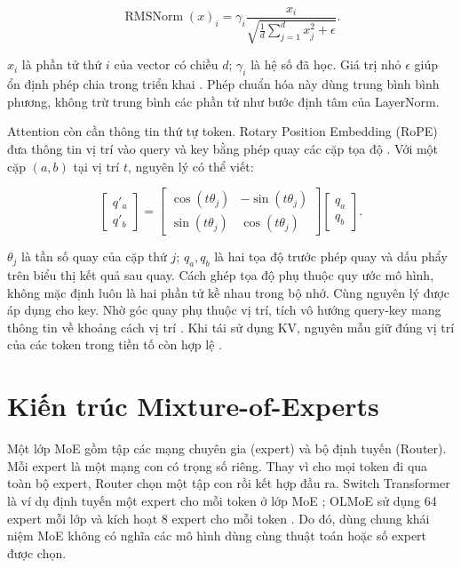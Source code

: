 \begin{equation}
\label{eq:2.3}
\operatorname{RMSNorm}(x)_i=\gamma_i\frac{x_i}{\sqrt{\frac{1}{d}\sum_{j=1}^{d}x_j^2+\epsilon}}.
\end{equation}

$x_i$ là phần tử thứ $i$ của vector có chiều $d$; $\gamma_i$ là hệ số đã học. Giá trị nhỏ $\epsilon$ giúp ổn định phép chia trong triển khai \cite{moe_tierengine_arch}. Phép chuẩn hóa này dùng trung bình bình phương, không trừ trung bình các phần tử như bước định tâm của LayerNorm.

Attention còn cần thông tin thứ tự token. Rotary Position Embedding (RoPE) đưa thông tin vị trí vào query và key bằng phép quay các cặp tọa độ \cite[mục 3.2]{roformer}. Với một cặp $(a,b)$ tại vị trí $t$, nguyên lý có thể viết:

\begin{equation}
\label{eq:2.4}
\begin{bmatrix}q'_a\\q'_b\end{bmatrix}
=\begin{bmatrix}\cos(t\theta_j)&-\sin(t\theta_j)\\\sin(t\theta_j)&\cos(t\theta_j)\end{bmatrix}
\begin{bmatrix}q_a\\q_b\end{bmatrix}.
\end{equation}

$\theta_j$ là tần số quay của cặp thứ $j$; $q_a,q_b$ là hai tọa độ trước phép quay và dấu phẩy trên biểu thị kết quả sau quay. Cách ghép tọa độ phụ thuộc quy ước mô hình, không mặc định luôn là hai phần tử kề nhau trong bộ nhớ. Cùng nguyên lý được áp dụng cho key. Nhờ góc quay phụ thuộc vị trí, tích vô hướng query-key mang thông tin về khoảng cách vị trí \cite{roformer}. Khi tái sử dụng KV, nguyên mẫu giữ đúng vị trí của các token trong tiền tố còn hợp lệ \cite{moe_tierengine_arch}.

\section{Kiến trúc Mixture-of-Experts}

Một lớp MoE gồm tập các mạng chuyên gia (expert) và bộ định tuyến (Router). Mỗi expert là một mạng con có trọng số riêng. Thay vì cho mọi token đi qua toàn bộ expert, Router chọn một tập con rồi kết hợp đầu ra. Switch Transformer là ví dụ định tuyến một expert cho mỗi token ở lớp MoE \cite{switch_transformers}; OLMoE sử dụng 64 expert mỗi lớp và kích hoạt 8 expert cho mỗi token \cite[mục 1]{olmoe}. Do đó, dùng chung khái niệm MoE không có nghĩa các mô hình dùng cùng thuật toán hoặc số expert được chọn.

